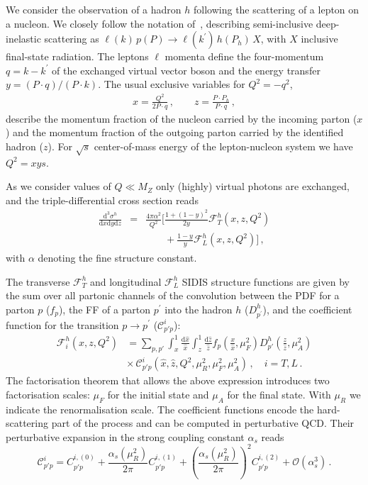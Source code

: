 \documentclass[10pt,aps,prl,twocolumn,preprintnumbers,nofootinbib]{revtex4-2}
\newcommand{\der}{\mathrm{d}}
\newcommand{\Fcal}{\mathcal{F}}
\newcommand{\Ccal}{\mathcal{C}}
\newcommand{\hx}{\hat{x}}
\newcommand{\hz}{\hat{z}}
\begin{document}
We consider the observation of a hadron $h$ following the scattering of a lepton
on a nucleon. We closely follow the notation of~\cite{Anderle:2012rq},
describing semi-inclusive deep-inelastic scattering as
$\ell(k)\,p(P)\to\ell(k^{\prime})\,h(P_h)\,X$, with $X$ inclusive final-state
radiation. The leptons $\ell$ momenta define the four-momentum $q=k-k^{\prime}$
of the exchanged virtual vector boson and the energy transfer $y=(P\cdot
q)/(P\cdot k)$.  The usual exclusive variables for $Q^2=-q^2$,
\begin{align}
x=\frac{Q^2}{2P\cdot q}\, ,\quad \quad z=\frac{P\cdot P_h}{P\cdot q}  \,  ,
\end{align}
describe the momentum fraction of the nucleon carried by the incoming parton
($x$) and the momentum fraction of the outgoing parton carried by the identified
hadron ($z$).  For $\sqrt{s}$ center-of-mass energy of the lepton-nucleon system
we have $Q^2=xys$.

As we consider values of $Q\ll M_Z$ only (highly) virtual photons are exchanged,
and the triple-differential cross section reads
\begin{eqnarray}\label{d3sigdxdydz}
  \frac{\der^3\sigma^h}{\der x \der y \der z} &=& \frac{4\pi\alpha^2}{Q^2} \bigg[
    \frac{1+(1-y)^2}{2y} \Fcal^h_T(x,z,Q^2)
    \nonumber \\ && \phantom{\frac{4\pi\alpha^2}{Q^2} \bigg[}
    + \frac{1-y}{y} \Fcal^h_L(x,z,Q^2) \bigg] \, ,
\end{eqnarray}
with $\alpha$ denoting the fine structure constant. 

The transverse $\Fcal^h_T$ and longitudinal $\Fcal^h_L$ SIDIS structure
functions are given by the sum over all partonic channels of the convolution
between the PDF for a parton $p$ ($f_p$), the FF of a parton $p^{\prime}$ into
the hadron $h$ ($D^h_{p^{\prime}}$), and the coefficient function for the
transition $p\to p^{\prime}$ ($\Ccal^i_{p' p}$):
\begin{align}
  \Fcal_i^h(x,z,Q^2) &= \sum_{p,p'} \int_x^1 \frac{\der\hx}{\hx}
  \int_z^1 \frac{\der\hz}{\hz} f_p\left(\frac{x}{\hx},\mu_F^2\right)
  D_{p'}^h\left(\frac{z}{\hz},\mu_A^2\right)  
  \nonumber \\ 
  &\times\,\Ccal^i_{p' p}\left(\hx,\hz,Q^2,\mu_R^2,\mu_F^2,\mu_A^2\right)\,,
  \quad i = T,L \, .
\end{align}
The factorisation theorem that allows the above expression introduces two
factorisation scales: $\mu_F$ for the initial state and $\mu_A$ for the final
state.  With $\mu_R$ we indicate the renormalisation scale.  The coefficient
functions encode the hard-scattering part of the process and can be computed in
perturbative QCD. Their perturbative expansion in the strong coupling constant
$\alpha_s$ reads
\begin{equation}
  \Ccal^i_{p' p} = C^{i,(0)}_{p' p}
  + \frac{\alpha_s(\mu_R^2)}{2\pi} C^{i,(1)}_{p' p}
  + \left(\frac{\alpha_s(\mu_R^2)}{2\pi}\right)^2  C^{i,(2)}_{p' p}
  + \mathcal{O}(\alpha_s^3)\, .
\end{equation}
\end{document}

